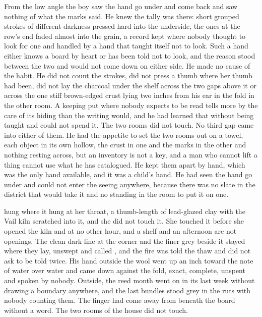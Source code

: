 From the low angle the boy saw the hand go under and come back and saw nothing of what the marks said. He knew the tally was there: short grouped strokes of different darkness pressed hard into the underside, the ones at the row's end faded almost into the grain, a record kept where nobody thought to look for one and handled by a hand that taught itself not to look. Such a hand either knows a board by heart or has been told not to look, and the reason stood between the two and would not come down on either side. He made no cause of the habit. He did not count the strokes, did not press a thumb where her thumb had been, did not lay the charcoal under the shelf across the two gaps above it or across the one stiff brown-edged crust lying two inches from his ear in the fold in the other room. A keeping put where nobody expects to be read tells more by the care of its hiding than the writing would, and he had learned that without being taught and could not spend it. The two rooms did not touch. No third gap came into either of them. He had the appetite to set the two rooms out on a towel, each object in its own hollow, the crust in one and the marks in the other and nothing resting across, but an inventory is not a key, and a man who cannot lift a thing cannot use what he has catalogued. He kept them apart by hand, which was the only hand available, and it was a child's hand. He had seen the hand go under and could not enter the seeing anywhere, because there was no slate in the district that would take it and no standing in the room to put it on one.

 hung where it hung at her throat, a thumb-length of lead-glazed clay with the Vail kiln scratched into it, and she did not touch it. She touched it before she opened the kiln and at no other hour, and a shelf and an afternoon are not openings. The clean dark line at the corner and the finer grey beside it stayed where they lay, unswept and called , and the fire was told the thaw and did not ask to be told twice. His hand outside the wool went up an inch toward the note of water over water and came down against the fold, exact, complete, unspent and spoken by nobody. Outside, the reed month went on in its last week without drawing a boundary anywhere, and the last bundles stood grey in the ruts with nobody counting them. The finger had come away from beneath the board without a word. The two rooms of the house did not touch.
